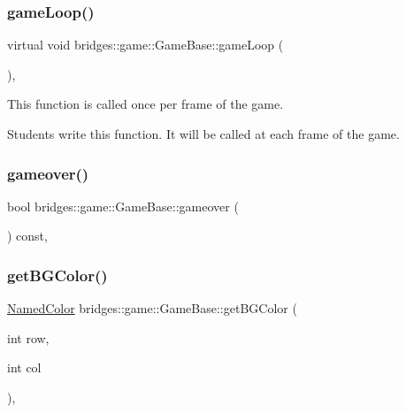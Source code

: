 \subsubsection{\texorpdfstring{game\+Loop()}{gameLoop()}}
{\footnotesize\ttfamily virtual void bridges\+::game\+::\+Game\+Base\+::game\+Loop (\begin{DoxyParamCaption}{ }\end{DoxyParamCaption})\hspace{0.3cm}{\ttfamily [protected]}, {}}



This function is called once per frame of the game. 

Students write this function. It will be called at each frame of the game. \mbox{\label{classbridges_1_1game_1_1_game_base_adbc9759ea7995f2ee224e9b85d798f2f}} 
\subsubsection{\texorpdfstring{gameover()}{gameover()}}
{\footnotesize\ttfamily bool bridges\+::game\+::\+Game\+Base\+::gameover (\begin{DoxyParamCaption}{ }\end{DoxyParamCaption}) const\hspace{0.3cm}{\ttfamily [inline]}, {\ttfamily [protected]}}

\mbox{\label{classbridges_1_1game_1_1_game_base_a924f911774a89d18ccb391bb28fd703c}} 
\subsubsection{\texorpdfstring{get\+B\+G\+Color()}{getBGColor()}}
{\footnotesize\ttfamily \hyperlink{namespacebridges_1_1game_afaa832a4322b25b6a4ebfba832f10f26}{Named\+Color} bridges\+::game\+::\+Game\+Base\+::get\+B\+G\+Color (\begin{DoxyParamCaption}\item[{int}]{row,  }\item[{int}]{col }\end{DoxyParamCaption})\hspace{0.3cm}{\ttfamily [inline]}, {\ttfamily [protected]}}



